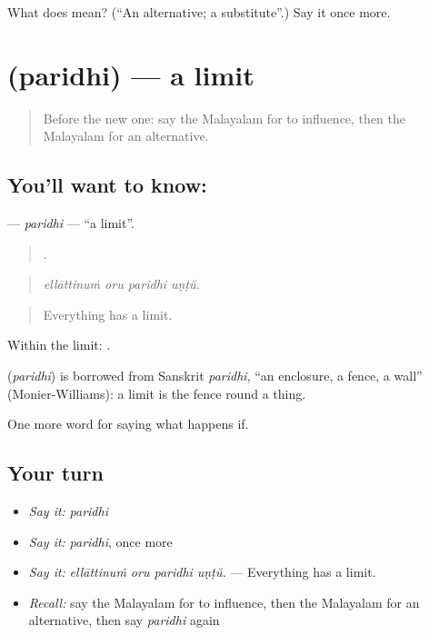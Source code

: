 \begin{tcolorbox}[breakable,colback=teal!4,colframe=teal!35!black,title={Before you move on}]
What does  mean? (\textquotedblleft{}An alternative; a substitute\textquotedblright{}.) Say it once more.
\end{tcolorbox}
\section[\texorpdfstring{\ml{പരിധി} (paridhi)}{പരിധി (paridhi)}]{ (paridhi) — a limit}

\label{lesson:ML-C443-paridhi}



\begin{quote}
Before the new one: say the Malayalam for to influence, then the Malayalam for an alternative.
\end{quote}

\subsection*{You'll want to know: }
\textbf{} — \emph{paridhi} — \textquotedblleft{}a limit\textquotedblright{}.

\begin{quote}
   .
\end{quote}

\begin{quote}
\emph{ellāttinuṁ oru paridhi uṇṭŭ.}
\end{quote}

\begin{quote}
Everything has a limit.
\end{quote}

Within the limit: .

\begin{cousinweb}
\textbf{} (\emph{paridhi}) is borrowed from Sanskrit \emph{paridhi}, \textquotedblleft{}an enclosure, a fence, a wall\textquotedblright{} (Monier-Williams): a limit is the fence round a thing.
\end{cousinweb}

\begin{grammarlens}[title={What you've built}]
One more word for saying what happens if.
\end{grammarlens}

\subsection*{Your turn}
\begin{itemize}
\raggedright
  \item \emph{Say it:} \emph{paridhi}
  \item \emph{Say it:} \emph{paridhi}, once more
  \item \emph{Say it:} \emph{ellāttinuṁ oru paridhi uṇṭŭ.} — Everything has a limit.
  \item \emph{Recall:} say the Malayalam for to influence, then the Malayalam for an alternative, then say \emph{paridhi} again
\end{itemize}

